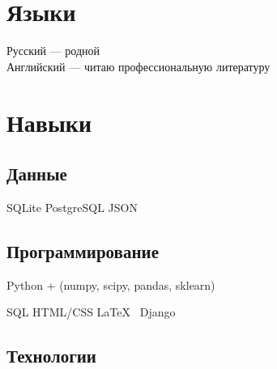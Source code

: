 \documentclass[a4paper]{resume}
\begin{document}
\begin{minipage}[t]{0.35\textwidth} {\Large }
\sectionspace




\sectionspace 
\section{Языки}
\large{Русский} — родной \\
\large{Английский} — читаю профессиональную литературу



\sectionspace 


\section{Навыки}

\subsection{Данные}
SQLite \textbullet{} PostgreSQL \textbullet {}JSON
\sectionspace

\subsection{Программирование}

Python + (numpy, scipy, pandas, sklearn)

SQL \textbullet{} HTML/CSS \textbullet{} \LaTeX\ \textbullet{} Django

\sectionspace

\subsection{Технологии}


\end{minipage}
\end{document}
